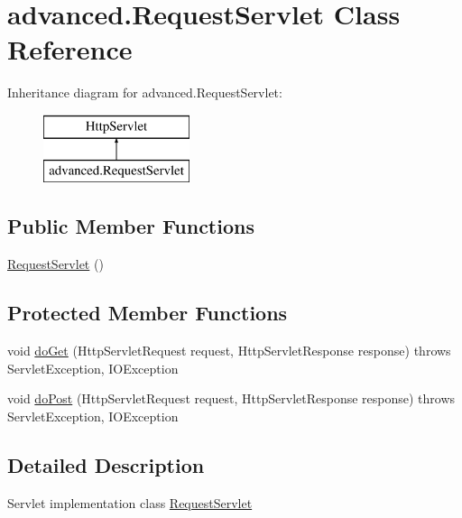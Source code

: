 \hypertarget{classadvanced_1_1_request_servlet}{}\section{advanced.\+Request\+Servlet Class Reference}
\label{classadvanced_1_1_request_servlet}
Inheritance diagram for advanced.\+Request\+Servlet\+:\begin{figure}[H]
\begin{center}
\leavevmode
\includegraphics[height=2.000000cm]{classadvanced_1_1_request_servlet}
\end{center}
\end{figure}
\subsection*{Public Member Functions}
\begin{DoxyCompactItemize}
\item 
\hyperlink{classadvanced_1_1_request_servlet_ac03b771e0d06eb69766ac2df52cb5f2f}{Request\+Servlet} ()
\end{DoxyCompactItemize}
\subsection*{Protected Member Functions}
\begin{DoxyCompactItemize}
\item 
void \hyperlink{classadvanced_1_1_request_servlet_a56fd652c4380a401d80754ca12cdbbbc}{do\+Get} (Http\+Servlet\+Request request, Http\+Servlet\+Response response)  throws Servlet\+Exception, I\+O\+Exception 
\item 
void \hyperlink{classadvanced_1_1_request_servlet_acd5fa3621347affb7135a9a44853265f}{do\+Post} (Http\+Servlet\+Request request, Http\+Servlet\+Response response)  throws Servlet\+Exception, I\+O\+Exception 
\end{DoxyCompactItemize}


\subsection{Detailed Description}
Servlet implementation class \hyperlink{classadvanced_1_1_request_servlet}{Request\+Servlet} 

